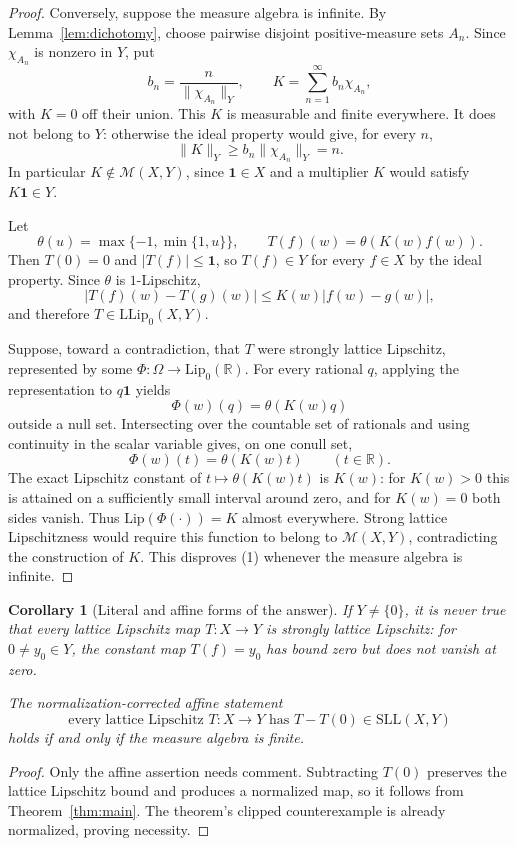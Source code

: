 \documentclass[11pt]{article}
\newtheorem{corollary}[theorem]{Corollary}
\newcommand{\LL}{\mathrm{LLip}}
\newcommand{\SLL}{\mathrm{SLL}}
\newcommand{\Lip}{\mathrm{Lip}}
\newcommand{\M}{\mathcal M}
\newcommand{\1}{\mathbf 1}
\begin{document}
\begin{proof}
Conversely, suppose the measure algebra is infinite.  By
Lemma~\ref{lem:dichotomy}, choose pairwise disjoint positive-measure sets
$A_n$.  Since $\chi_{A_n}$ is nonzero in $Y$, put
\[
 b_n=\frac{n}{\|\chi_{A_n}\|_Y},
 \qquad
 K=\sum_{n=1}^\infty b_n\chi_{A_n},
\]
with $K=0$ off their union.  This $K$ is measurable and finite everywhere.
It does not belong to $Y$: otherwise the ideal property would give, for every
$n$,
\[
 \|K\|_Y\geq b_n\|\chi_{A_n}\|_Y=n.
\]
In particular $K\notin\M(X,Y)$, since $\1\in X$ and a multiplier $K$ would
satisfy $K\1\in Y$.

Let
\[
 \theta(u)=\max\{-1,\min\{1,u\}\},
 \qquad T(f)(w)=\theta(K(w)f(w)).
\]
Then $T(0)=0$ and $|T(f)|\leq\1$, so $T(f)\in Y$ for every $f\in X$ by the
ideal property.  Since $\theta$ is $1$-Lipschitz,
\[
 |T(f)(w)-T(g)(w)|\leq K(w)|f(w)-g(w)|,
\]
and therefore $T\in\LL_0(X,Y)$.

Suppose, toward a contradiction, that $T$ were strongly lattice Lipschitz,
represented by some $\Phi:\Omega\to\Lip_0(\mathbb R)$.  For every rational
$q$, applying the representation to $q\1$ yields
\[
 \Phi(w)(q)=\theta(K(w)q)
\]
outside a null set.  Intersecting over the countable set of rationals and
using continuity in the scalar variable gives, on one conull set,
\[
 \Phi(w)(t)=\theta(K(w)t)\qquad(t\in\mathbb R).
\]
The exact Lipschitz constant of $t\mapsto\theta(K(w)t)$ is $K(w)$: for
$K(w)>0$ this is attained on a sufficiently small interval around zero, and
for $K(w)=0$ both sides vanish.  Thus
$\Lip(\Phi(\cdot))=K$ almost everywhere.  Strong lattice Lipschitzness would
require this function to belong to $\M(X,Y)$, contradicting the construction
of $K$.  This disproves (1) whenever the measure algebra is infinite.
\end{proof}

\begin{corollary}[Literal and affine forms of the answer]
If $Y\neq\{0\}$, it is never true that every lattice Lipschitz map
$T:X\to Y$ is strongly lattice Lipschitz: for $0\neq y_0\in Y$, the constant
map $T(f)=y_0$ has bound zero but does not vanish at zero.

The normalization-corrected affine statement
\[
 \text{every lattice Lipschitz }T:X\to Y
 \text{ has }T-T(0)\in\SLL(X,Y)
\]
holds if and only if the measure algebra is finite.
\end{corollary}

\begin{proof}
Only the affine assertion needs comment.  Subtracting $T(0)$ preserves the
lattice Lipschitz bound and produces a normalized map, so it follows from
Theorem~\ref{thm:main}.  The theorem's clipped counterexample is already
normalized, proving necessity.
\end{proof}
\end{document}
